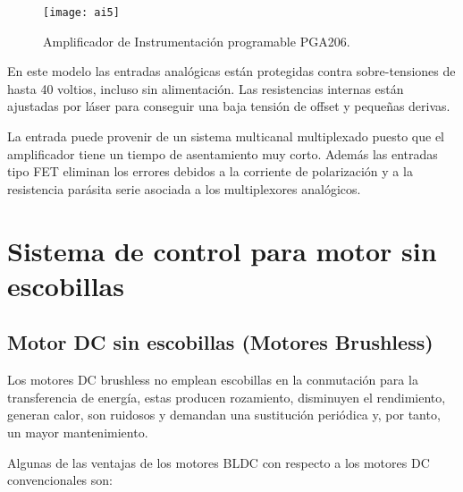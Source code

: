 \begin{figure}[h]
  \centering
  \texttt{[image: ai5]}
  \caption{Amplificador de Instrumentación programable PGA206.}\label{fig:programable}
\end{figure}

En este modelo las entradas analógicas están protegidas contra sobre-tensiones de hasta 40 voltios, incluso sin alimentación. Las resistencias internas están ajustadas por láser para conseguir una baja tensión de offset y pequeñas derivas.

La entrada puede provenir de un sistema multicanal multiplexado puesto que el amplificador tiene un tiempo de asentamiento muy corto. Además las entradas tipo FET eliminan los errores debidos a la corriente de polarización y a la resistencia parásita serie asociada a los multiplexores analógicos.




\section{Sistema de control para motor sin escobillas} %
\label{sec:sistema_de_control_para_motor_sin_escobillas}


\subsection{Motor DC sin escobillas (Motores Brushless)}
\label{subsec: motor_sin_escobillas}

Los motores DC brushless no emplean escobillas en la conmutación para la transferencia de energía, estas producen rozamiento, disminuyen el rendimiento, generan calor, son ruidosos y demandan una sustitución periódica y, por tanto, un mayor mantenimiento.

Algunas de las ventajas de los motores BLDC con respecto a los motores DC convencionales son:

